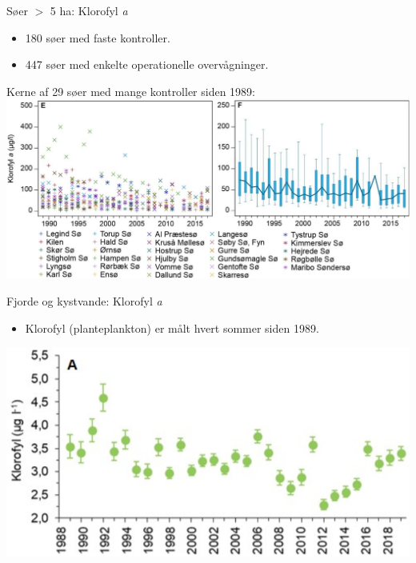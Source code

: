 \begin{frame}{Søer $>$ 5 ha: Klorofyl \textit{a}}
  \begin{itemize}
    \item 180 søer med faste kontroller.
    \item 447 søer med enkelte operationelle overvågninger.
  \end{itemize}
  Kerne af 29 søer med mange kontroller siden 1989:
  \includegraphics[width=\textwidth]{figures/chlorophyll_lakes}
\end{frame}

\begin{frame}{Fjorde og kystvande: Klorofyl \textit{a}}
  \begin{itemize}
    \item Klorofyl (planteplankton) er målt hvert sommer siden 1989.
  \end{itemize}
  \includegraphics[width=\textwidth]{figures/chlorophyll_fjords_coastal}
\end{frame}

